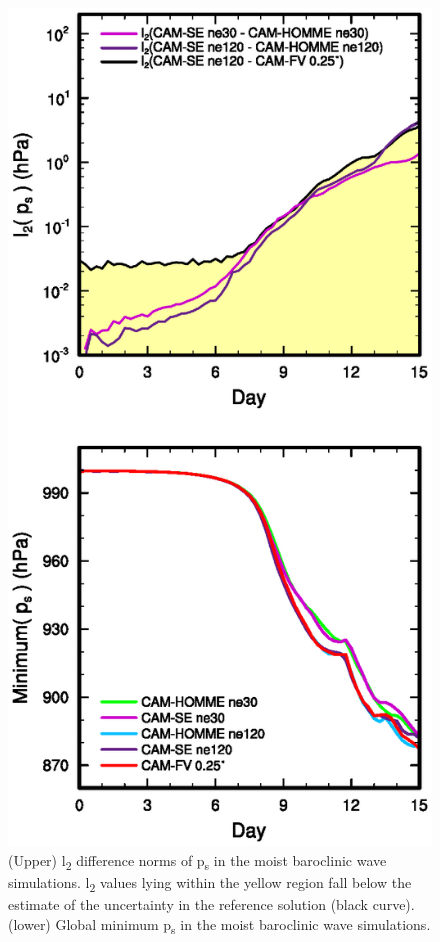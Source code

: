 \begin{figure}[h]
\centering
\includegraphics[width=40pc]{figs/temp_l2_reference.eps}
\caption{(Upper) l\textsubscript{2} difference norms of p\textsubscript{s} in the moist baroclinic wave simulations. l\textsubscript{2} values lying within the yellow region fall below the estimate of the uncertainty in the reference solution (black curve). (lower) Global minimum p\textsubscript{s} in the moist baroclinic wave simulations.}
\label{fig:l2norm}
\end{figure}
